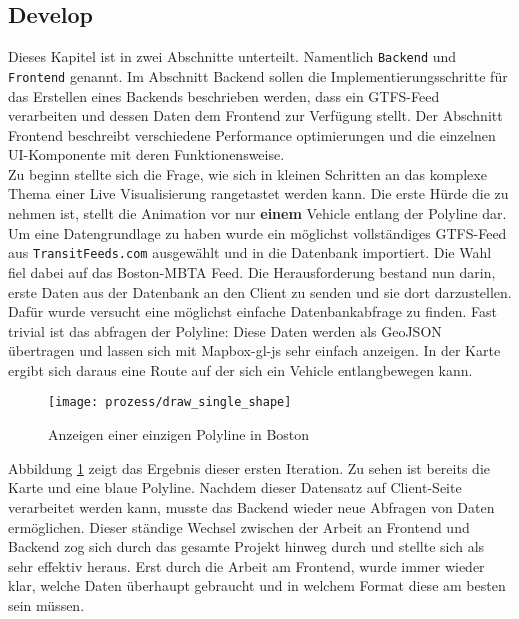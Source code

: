 \begin{newpage}
  \section{Develop}
  \label{sec:develop}

    Dieses Kapitel ist in zwei Abschnitte unterteilt. Namentlich \texttt{Backend} und \texttt{Frontend} genannt. Im Abschnitt Backend sollen die Implementierungsschritte für das Erstellen eines Backends beschrieben werden, dass ein GTFS-Feed verarbeiten und dessen Daten dem Frontend zur Verfügung stellt. Der Abschnitt Frontend beschreibt verschiedene Performance optimierungen und die einzelnen UI-Komponente mit deren Funktionensweise.\\

    Zu beginn stellte sich die Frage, wie sich in kleinen Schritten an das komplexe Thema einer Live Visualisierung rangetastet werden kann. Die erste Hürde die zu nehmen ist, stellt die Animation vor nur \textbf{einem} Vehicle entlang der Polyline dar.
    Um eine Datengrundlage zu haben wurde ein möglichst vollständiges GTFS-Feed aus \texttt{TransitFeeds.com} ausgewählt und in die Datenbank importiert. Die Wahl fiel dabei auf das Boston-MBTA Feed. Die Herausforderung bestand nun darin, erste Daten aus der Datenbank an den Client zu senden und sie dort darzustellen. Dafür wurde versucht eine möglichst einfache Datenbankabfrage zu finden. Fast trivial ist das abfragen der Polyline: \colorbox{lightGrey}{\texttt{}}
    Diese Daten werden als GeoJSON übertragen und lassen sich mit Mapbox-gl-js sehr einfach anzeigen. In der Karte ergibt sich daraus eine Route auf der sich ein Vehicle entlangbewegen kann.

    \begin{figure}[htbp]
      \begin{center}
        \texttt{[image: prozess/draw\_single\_shape]}
        \caption{Anzeigen einer einzigen Polyline in Boston}
        \label{fig:prozess/draw_single_shape}
      \end{center}
    \end{figure}
    
    Abbildung \ref{fig:prozess/draw_single_shape} zeigt das Ergebnis dieser ersten Iteration. Zu sehen ist bereits die Karte und eine blaue Polyline. Nachdem dieser Datensatz auf Client-Seite verarbeitet werden kann, musste das Backend wieder neue Abfragen von Daten ermöglichen. Dieser ständige Wechsel zwischen der Arbeit an Frontend und Backend zog sich durch das gesamte Projekt hinweg durch und stellte sich als sehr effektiv heraus. Erst durch die Arbeit am Frontend, wurde immer wieder klar, welche Daten überhaupt gebraucht und in welchem Format diese am besten sein müssen.\\


\end{newpage}

